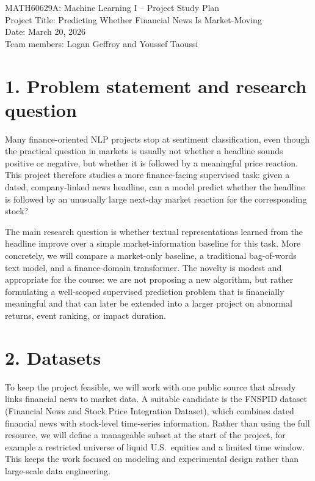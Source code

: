 \documentclass[11pt]{article}
\begin{document}
\begin{center}
{\Large MATH60629A: Machine Learning I -- Project Study Plan} \\
\vspace{0.5em}
{\large Project Title: Predicting Whether Financial News Is Market-Moving} \\
\vspace{0.5em}
Date: March 20, 2026 \\
Team members: Logan Geffroy and Youssef Taoussi
\end{center}

\section*{1. Problem statement and research question}
Many finance-oriented NLP projects stop at sentiment classification, even though the practical question in markets is usually not whether a headline sounds positive or negative, but whether it is followed by a meaningful price reaction. This project therefore studies a more finance-facing supervised task: given a dated, company-linked news headline, can a model predict whether the headline is followed by an unusually large next-day market reaction for the corresponding stock?

The main research question is whether textual representations learned from the headline improve over a simple market-information baseline for this task. More concretely, we will compare a market-only baseline, a traditional bag-of-words text model, and a finance-domain transformer. The novelty is modest and appropriate for the course: we are not proposing a new algorithm, but rather formulating a well-scoped supervised prediction problem that is financially meaningful and that can later be extended into a larger project on abnormal returns, event ranking, or impact duration.

\section*{2. Datasets}
To keep the project feasible, we will work with one public source that already links financial news to market data. A suitable candidate is the FNSPID dataset (Financial News and Stock Price Integration Dataset), which combines dated financial news with stock-level time-series information. Rather than using the full resource, we will define a manageable subset at the start of the project, for example a restricted universe of liquid U.S.\ equities and a limited time window. This keeps the work focused on modeling and experimental design rather than large-scale data engineering.
\end{document}
